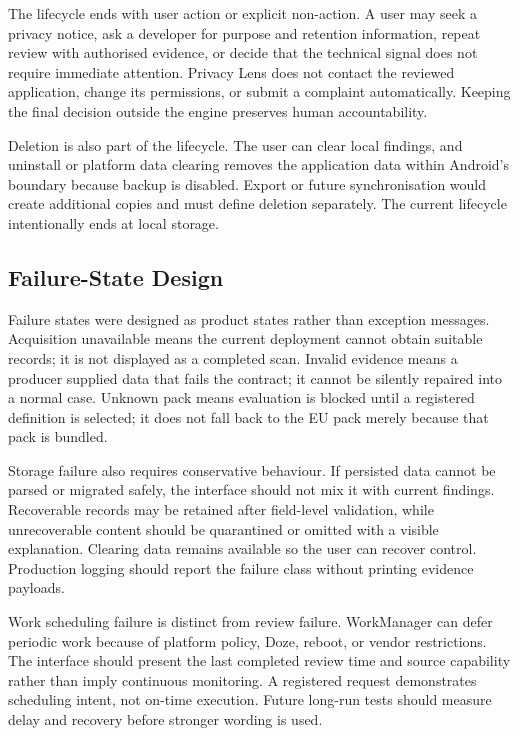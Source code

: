 The lifecycle ends with user action or explicit non-action. A user may seek a privacy notice, ask a developer for purpose and retention information, repeat review with authorised evidence, or decide that the technical signal does not require immediate attention. Privacy Lens does not contact the reviewed application, change its permissions, or submit a complaint automatically. Keeping the final decision outside the engine preserves human accountability.

Deletion is also part of the lifecycle. The user can clear local findings, and uninstall or platform data clearing removes the application data within Android's boundary because backup is disabled. Export or future synchronisation would create additional copies and must define deletion separately. The current lifecycle intentionally ends at local storage.

\subsection{Failure-State Design}

Failure states were designed as product states rather than exception messages. Acquisition unavailable means the current deployment cannot obtain suitable records; it is not displayed as a completed scan. Invalid evidence means a producer supplied data that fails the contract; it cannot be silently repaired into a normal case. Unknown pack means evaluation is blocked until a registered definition is selected; it does not fall back to the EU pack merely because that pack is bundled.

Storage failure also requires conservative behaviour. If persisted data cannot be parsed or migrated safely, the interface should not mix it with current findings. Recoverable records may be retained after field-level validation, while unrecoverable content should be quarantined or omitted with a visible explanation. Clearing data remains available so the user can recover control. Production logging should report the failure class without printing evidence payloads.

Work scheduling failure is distinct from review failure. WorkManager can defer periodic work because of platform policy, Doze, reboot, or vendor restrictions. The interface should present the last completed review time and source capability rather than imply continuous monitoring. A registered request demonstrates scheduling intent, not on-time execution. Future long-run tests should measure delay and recovery before stronger wording is used.

